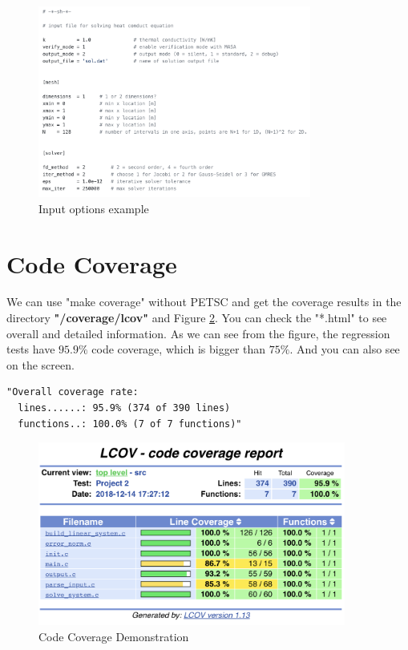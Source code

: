 \documentclass[a4paper]{article}
\begin{document}
\begin{figure}[htbp]
\centering
\includegraphics[width=0.8\textwidth]{input.png}
\caption{\label{input}Input options example}
\end{figure}

\newpage
\section{Code Coverage}
We can use "make coverage" without PETSC and get the coverage results in the directory \textbf{"/coverage/lcov"} and Figure \ref{coverage}. You can check the "*.html" to see overall and detailed information.
As we can see from the figure, the regression tests have $95.9\%$ code coverage, which is bigger than $75\%$.
And you can also see on the screen. \\
\begin{verbatim}
"Overall coverage rate:
  lines......: 95.9% (374 of 390 lines)
  functions..: 100.0% (7 of 7 functions)"
\end{verbatim}
\begin{figure}[htbp]
\centering
\includegraphics[width=0.9\textwidth]{coverage.png}
\caption{\label{coverage}Code Coverage Demonstration}
\end{figure}
\end{document}
